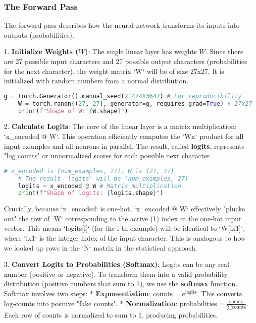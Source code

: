 \subsubsection{The Forward Pass}
The forward pass describes how the neural network transforms its inputs into outputs (probabilities).

1.  \textbf{Initialize Weights ($W$)}: The single linear layer has weights $W$. Since there are 27 possible input characters and 27 possible output characters (probabilities for the next character), the weight matrix `W` will be of size 27x27. It is initialized with random numbers from a normal distribution.

    \begin{lstlisting}[language=Python, caption=Initializing Weights]
    g = torch.Generator().manual_seed(2147483647) # For reproducibility
    W = torch.randn((27, 27), generator=g, requires_grad=True) # 27x27 weights
    print(f"Shape of W: {W.shape}")
    \end{lstlisting}

2.  \textbf{Calculate Logits}: The core of the linear layer is a matrix multiplication: `x_encoded @ W`. This operation efficiently computes the `Wx` product for all input examples and all neurons in parallel. The result, called \textbf{logits}, represents "log counts" or unnormalized scores for each possible next character.

    \begin{lstlisting}[language=Python, caption=Calculating Logits]
    # x_encoded is (num_examples, 27), W is (27, 27)
    # The result 'logits' will be (num_examples, 27)
    logits = x_encoded @ W # Matrix multiplication
    print(f"Shape of logits: {logits.shape}")
    \end{lstlisting}

    Crucially, because `x_encoded` is one-hot, `x_encoded @ W` effectively "plucks out" the row of `W` corresponding to the active (1) index in the one-hot input vector. This means `logits[i]` (for the i-th example) will be identical to `W[ix1]`, where `ix1` is the integer index of the input character. This is analogous to how we looked up rows in the `N` matrix in the statistical approach.

3.  \textbf{Convert Logits to Probabilities (Softmax)}: Logits can be any real number (positive or negative). To transform them into a valid probability distribution (positive numbers that sum to 1), we use the \textbf{softmax} function. Softmax involves two steps:
    *   \textbf{Exponentiation}: $\text{counts} = e^{\text{logits}}$. This converts log-counts into positive "fake counts".
    *   \textbf{Normalization}: $\text{probabilities} = \frac{\text{counts}}{\sum \text{counts}}$. Each row of counts is normalized to sum to 1, producing probabilities.


